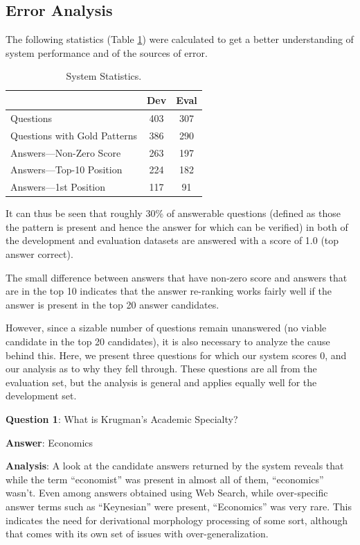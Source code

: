 \documentclass[11pt]{article}
\begin{document}
\subsection{Error Analysis}
The following statistics (Table \ref{stats}) were calculated to get a better understanding of system performance and of the sources of error. 

\begin{table}[h]
\begin{center}
\begin{tabular}{ |l |c |c| }
\hline
& Dev & Eval\\
\hline
Questions & 403 & 307\\
Questions with Gold Patterns & 386 & 290\\
Answers---Non-Zero Score & 263 & 197\\
Answers---Top-10 Position & 224 & 182\\
Answers---1st Position & 117 & 91\\
\hline
\end{tabular}
\end{center}
\caption{\label{stats} System Statistics. 
}
\end{table}
It can thus be seen that roughly 30\% of answerable questions (defined as those the pattern is present and hence the answer for which can be verified) in both of the development and evaluation datasets are answered with a score of 1.0 (top answer correct).

The small difference between answers that have non-zero score and answers that are in the top 10 indicates that the answer re-ranking works fairly well if the answer is present in the top 20 answer candidates. 

However, since a sizable number of questions remain unanswered (no viable candidate in the top 20 candidates), it is also necessary to analyze the cause behind this.  Here, we present three questions for which our system scores 0, and our analysis as to why they fell through. These questions are all from the evaluation set, but the analysis is general and applies equally well for the development set.


\noindent \textbf{Question 1}: What is Krugman's Academic Specialty? 

\noindent \textbf{Answer}: Economics

\noindent \textbf{Analysis}: A look at the candidate answers returned by the system reveals that while the term ``economist'' was present in almost all of them, ``economics'' wasn't. Even among answers obtained using Web Search, while over-specific answer terms such as ``Keynesian'' were present, ``Economics'' was very rare. This indicates the need for derivational morphology processing of some sort, although that comes with its own set of issues with over-generalization.
\end{document}
